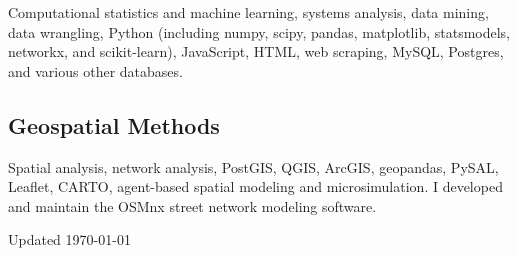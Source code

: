 \documentclass[12pt,letterpaper]{report}
\newcommand{\listitemspace}{0.15em}
\renewenvironment{itemize}
{\begin{list}{}{\setlength{\leftmargin}{0em}
			\setlength{\parskip}{0em}
			\setlength{\itemsep}{\listitemspace}
			\setlength{\parsep}{\listitemspace}}}
	{\end{list}}
\begin{document}
	\begin{itemize}

		\item Computational statistics and machine learning, systems analysis, data mining, data wrangling, Python (including numpy, scipy, pandas, matplotlib, statsmodels, networkx, and scikit-learn), JavaScript, HTML, web scraping, MySQL, Postgres, and various other databases.

	\end{itemize}

	\subsection*{Geospatial Methods}

	\begin{itemize}

		\item Spatial analysis, network analysis, PostGIS, QGIS, ArcGIS, geopandas, PySAL, Leaflet, CARTO, agent-based spatial modeling and microsimulation. I developed and maintain the OSMnx street network modeling software.

	\end{itemize}



	\begin{center}
		\vfill
		Updated \monthyeardate\today
	\end{center}
\end{document}

